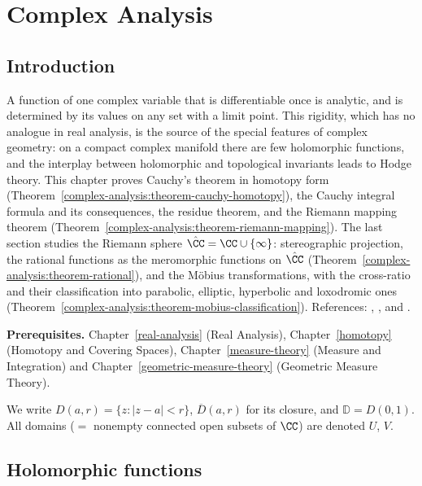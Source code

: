 \chapter{Complex Analysis}\label{complex-analysis}

\section{Introduction}\label{complex-analysis:section-introduction}

A function of one complex variable that is differentiable once is analytic, and is determined by its values on any set with a limit
point. This rigidity, which has no analogue in real analysis, is the source of the special features of complex geometry: on a compact
complex manifold there are few holomorphic functions, and the interplay between holomorphic and topological invariants leads to Hodge
theory. This chapter proves Cauchy's theorem in homotopy form (Theorem~\ref{complex-analysis:theorem-cauchy-homotopy}), the Cauchy
integral formula and its consequences, the residue theorem, and the Riemann mapping theorem
(Theorem~\ref{complex-analysis:theorem-riemann-mapping}). The last section studies the Riemann sphere $\hat{\CC} = \CC \cup \{\infty\}$: stereographic
projection, the rational functions as the meromorphic functions on $\hat{\CC}$ (Theorem~\ref{complex-analysis:theorem-rational}), and the M\"obius transformations, with the
cross-ratio and their classification into parabolic, elliptic, hyperbolic and loxodromic ones (Theorem~\ref{complex-analysis:theorem-mobius-classification}). References: \cite{ahlfors-complex}, \cite{stein-shakarchi-complex},
\cite{conway-complex} and \cite[Chapters 10--16]{rudin-rca}.

\noindent\textbf{Prerequisites.} Chapter~\ref{real-analysis} (Real Analysis), Chapter~\ref{homotopy} (Homotopy and Covering Spaces), Chapter~\ref{measure-theory} (Measure and Integration) and
Chapter~\ref{geometric-measure-theory} (Geometric Measure Theory).

We write $D(a, r) = \{z : |z - a| < r\}$, $\overline{D}(a, r)$ for its closure, and $\mathbb{D} = D(0, 1)$. All domains ($=$ nonempty connected
open subsets of $\CC$) are denoted $U$, $V$.

\section{Holomorphic functions}\label{complex-analysis:section-holomorphic}

